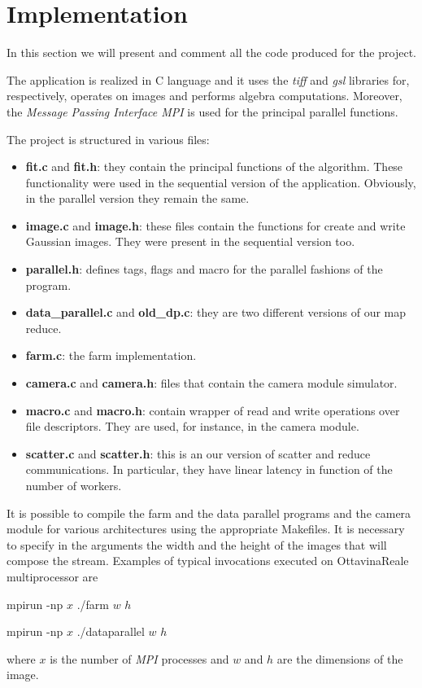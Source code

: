 \section{Implementation}

In this section we will present and comment all the code produced for the project.

The application is realized in C language and it uses the \textit{tiff} and \textit{gsl} libraries for, respectively, operates on images and performs algebra computations. Moreover, the \textit{Message Passing Interface MPI} is used for the principal parallel functions.

The project is structured in various files:
\begin{itemize}
\item \textbf{fit.c} and \textbf{fit.h}: they contain the principal functions of the algorithm. These functionality were used in the sequential version of the application. Obviously, in the parallel version they remain the same.
\item \textbf{image.c} and \textbf{image.h}: these files contain the functions for create and write Gaussian images. They were present in the sequential version too.
\item \textbf{parallel.h}: defines tags, flags and macro for the parallel fashions of the program.
\item \textbf{data\_parallel.c} and \textbf{old\_dp.c}: they are two different versions of our map reduce.
\item \textbf{farm.c}: the farm implementation.
\item \textbf{camera.c} and \textbf{camera.h}: files that contain the camera module simulator.
\item \textbf{macro.c} and \textbf{macro.h}: contain wrapper of read and write operations over file descriptors. They are used, for instance, in the camera module.
\item \textbf{scatter.c} and \textbf{scatter.h}: this is an our version of scatter and reduce communications. In particular, they have linear latency in function of the number of workers.
\end{itemize}

It is possible to compile the farm and the data parallel programs and the camera module for various architectures using the appropriate Makefiles. It is necessary to specify in the arguments the width and the height of the images that will compose the stream. Examples of typical invocations executed on OttavinaReale multiprocessor are
\begin{center}
mpirun -np $x$ ./farm $w$ $h$
\end{center}
\begin{center}
mpirun -np $x$ ./dataparallel $w$ $h$
\end{center}
where $x$ is the number of \textit{MPI} processes and $w$ and $h$ are the dimensions of the image.

